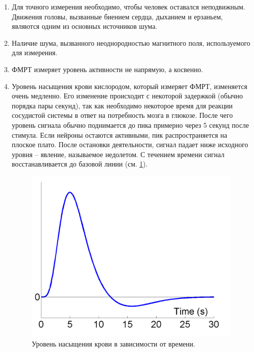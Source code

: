 \documentclass[pdftex,ptm,12pt,a4paper]{report}
\theoremstyle{definition}
\begin{document}
\begin{enumerate}
\item Для точного измерения необходимо, чтобы человек оставался неподвижным. Движения головы, вызванные биением сердца, дыханием и  ерзаньем, являются одним из основных источников шума.

\item Наличие шума, вызванного неоднородностью магнитного поля, используемого для измерения.

\item ФМРТ измеряет уровень активности не напрямую, а косвенно.

\item Уровень насыщения крови кислородом, который измеряет ФМРТ, изменяется очень медленно. Его изменение происходит с некоторой задержкой (обычно порядка пары секунд), так как необходимо некоторое время для реакции сосудистой системы в ответ на потребность мозга в глюкозе. После чего уровень сигнала обычно поднимается до пика примерно через 5 секунд после стимула. Если нейроны остаются активными, пик распространяется на плоское плато. После остановки деятельности, сигнал падает ниже исходного уровня -- явление, называемое недолетом. С течением времени сигнал восстанавливается до базовой линии (см. \ref{hrf}). 

\begin{figure}[h]
\includegraphics[scale=0.4]{images/hrf.png}
\centering
\caption{Уровень насыщения крови в зависимости от времени.}
\label{hrf}
\end{figure}

\end{enumerate}
\end{document}
